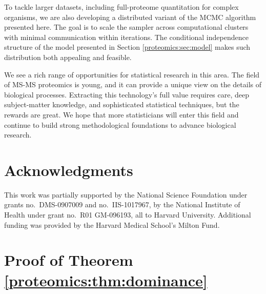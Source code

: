 To tackle larger datasets, including full-proteome quantitation for complex organisms, we are also developing a distributed variant of the MCMC algorithm presented here.
The goal is to scale the sampler across computational clusters with minimal communication within iterations.
The conditional independence structure of the model presented in Section \ref{proteomics:sec:model} makes such distribution both appealing and feasible.

We see a rich range of opportunities for statistical research in this area.
The field of MS-MS proteomics is young, and it can provide a unique view on the details of biological processes.
Extracting this technology's full value requires care, deep subject-matter knowledge, and sophisticated statistical techniques, but the rewards are great.
We hope that more statisticians will enter this field and continue to build strong methodological foundations to advance biological research.


\section{Acknowledgments}

This work was partially supported by the National Science Foundation under grants no.\ DMS-0907009 and no.\ IIS-1017967, by the National Institute of Health under grant no.\ R01 GM-096193, all to Harvard University. Additional funding was provided by the Harvard Medical School's Milton Fund.



\section{Proof of Theorem \ref{proteomics:thm:dominance}}
\label{proteomics:sec:proof1}

